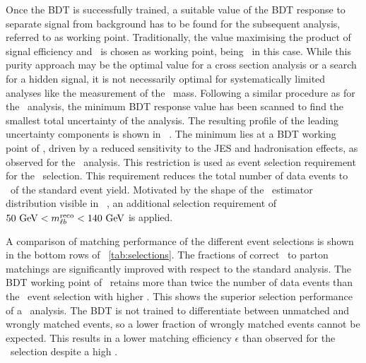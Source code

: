 Once the \gls{BDT} is successfully trained, a suitable value of the \gls{BDT} response to separate signal from background has to be found for the subsequent analysis, referred to as working point. 
%
Traditionally, the value maximising the product of signal efficiency and \selPurity\ is chosen as working point, being \BDTcutpureff\ in this case. While this purity approach may be the optimal value for a cross section analysis or a search for a hidden signal, it is not necessarily optimal for systematically limited analyses like the measurement of the \tquark\ mass. 
%
%
Following a similar procedure as for the \cutbased\ analysis, the minimum \gls{BDT} response value has been scanned to find the smallest total uncertainty of the analysis. The resulting profile of the leading uncertainty components is shown in ~. The minimum lies at a \gls{BDT} working point of \BDTcutoptieff, driven by a reduced sensitivity to the \gls{JES} and hadronisation effects, as observed for the \cutbased\ analysis. This restriction is used as event selection requirement for the \mvabased\ selection. This requirement reduces the total number of data events to \BDTOptiFraction\ of the standard event yield.
%
Motivated by the shape of the \mlbr\ estimator distribution visible in \fig~, an additional selection requirement of $50~\mathrm{GeV} < m_{\ell b}^{\mathrm{reco}} < 140~\mathrm{GeV}$ is applied.
%



A comparison of matching performance of the different event selections is shown in the bottom rows of \tab~\ref{tab:selections}.
%
The fractions of correct \bjet\ to parton matchings are significantly improved with respect to the standard analysis. 
%
%
The \gls{BDT} working point of \BDTcutoptieff\ retains more than twice the number of data events than the \cutbased\ event selection with higher \selPurity. 
%
%
This shows the superior selection performance of a \mvabased\ analysis.
%
The \gls{BDT} is not trained to differentiate between unmatched and wrongly matched events, so a lower fraction of wrongly matched events cannot be expected. This results in a lower matching efficiency $\epsilon$ than observed for the \cutbased\ selection despite a high \selPurity.


